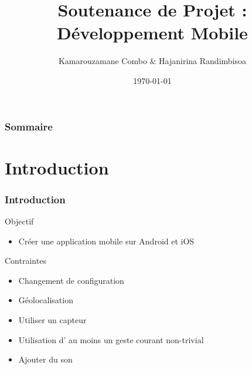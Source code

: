 \documentclass{beamer}
\title[Magic Tiles]{Soutenance de Projet : Développement Mobile} %
\author{Kamarouzamane Combo \& Hajanirina Randimbisoa} %
\institute{\normalsize{M1 Informatique Université de la Réunion}}
\date{\today} %
\begin{document}
\begin{frame}
\titlepage %
\end{frame}

\begin{frame}
\frametitle{Sommaire} %
\tableofcontents %
\end{frame}


\section{Introduction}



\begin{frame}
  \frametitle{Introduction}
  \begin{block}{Objectif}
    \begin{itemize}
    \item {Créer une application mobile sur Android et iOS}
    \end{itemize}
  \end{block}
    \begin{block}{Contraintes}
    \begin{itemize}
    \item {Changement de configuration}
    \item {Géolocalisation}
    \item {Utiliser un capteur}
    \item {Utilisation d' au moins un geste courant non-trivial}
    \item {Ajouter du son}
    \end{itemize}
  \end{block}
\end{frame}
\end{document}
